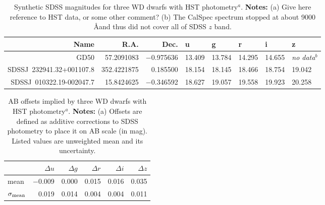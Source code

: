 \documentclass[fleqn,usenatbib]{mnras}
\begin{document}
\begin{table}
	\centering
	\begin{tabular}{r|r|r|l|l|l|l|l} %
		\hline
		Name & R.A. & Dec. & u & g & r & i & z \\
		\hline
     GD50                     &  57.2091083 &  $-$0.975636 &      13.409 &       13.784 &    14.295 &     14.655 &     {\it no data}$^b$ \\
     SDSSJ~232941.32+001107.8 & 352.4221875 &     0.185500 &      18.154 &       18.145 &    18.466 &     18.754 &     19.042 \\  
     SDSSJ~010322.19-002047.7 &  15.8424625 &  $-$0.346592 &      18.627 &       19.057 &    19.558 &     19.923 &     20.258 \\
		\hline
	\end{tabular}
	\caption{Synthetic SDSS magnitudes for three WD dwarfs with HST photometry$^a$. {\bf Notes:} (a) Give here reference to HST data, or some other comment? (b) The CalSpec spectrum stopped at about 9000 \AA and thus did not cover all of SDSS $z$ band.}
	\label{tab:HST}
\end{table}



\begin{table}
	\centering
	\begin{tabular}{l|r|r|r|r|r} %
		\hline
		& $\Delta u$ & $\Delta g$ &$\Delta r$ &$\Delta i$ &$\Delta z$ \\
		\hline
  		 {\rm mean}            &    $-$0.009    &        0.000     &      0.015    &       0.016    &      0.035     \\ 
  		$\sigma_{\rm mean}$ &         0.019    &        0.014     &      0.004    &       0.004    &      0.011     \\
		\hline
	\end{tabular}
	\caption{AB offsets implied by three WD dwarfs with HST photometry$^a$. {\bf Notes:} (a) Offsets are defined as additive corrections to SDSS photometry to place it on AB scale (in mag). Listed values are unweighted mean and its uncertainty.}
	\label{tab:AB}
\end{table}
 
\end{document}
